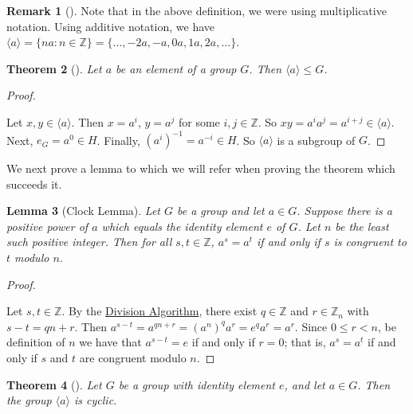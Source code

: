 \documentclass[10pt,openany,oneside]{book}
\theoremstyle{plain}
\newtheorem{theorem}{Theorem}[section]
\newtheorem{lemma}[theorem]{Lemma}
\theoremstyle{definition}
\theoremstyle{definition}
\newtheorem{remark}[theorem]{Remark}
\theoremstyle{definition}
\theoremstyle{definition}
\numberwithin{equation}{section}
\def\Z{\mathbb{Z}}
\newcommand{\lt}{<}
\begin{document}
\begin{remark}[]\label{remark-21}
Note that in the above definition, we were using multiplicative notation. Using additive notation, we have \(\langle a\rangle =\{na:n\in \Z\}=\{\ldots, -2a, -a, 0a, 1a, 2a, \ldots\}.\)%
\end{remark}
\begin{theorem}[{}]\label{theorem-23}
Let \(a\) be an element of a group \(G\). Then \(\langle a\rangle \leq G\).%
\end{theorem}
\begin{proof}\hypertarget{proof-19}{}
Let \(x,y\in \langle a\rangle\). Then \(x=a^i\), \(y=a^j\) for some \(i,j\in \Z\). So \(xy=a^ia^j=a^{i+j}\in \langle a\rangle\). Next, \(e_G=a^0\in H\). Finally, \((a^i)^{-1}=a^{-i}\in H\). So \(\langle a\rangle\) is a subgroup of \(G\).%
\end{proof}
We next prove a lemma to which we will refer when proving the theorem which succeeds it.%
\begin{lemma}[{Clock Lemma}]\label{clock}
Let \(G\) be a group and let \(a \in G\). Suppose there is a positive power of \(a\) which equals the identity element \(e\) of \(G\). Let \(n\) be the least such positive integer. Then for all \(s,t\in \Z\), \(a^s=a^t\) if and only if \(s\) is congruent to \(t\) modulo \(n\).%
\end{lemma}
\begin{proof}\hypertarget{proof-20}{}
Let \(s,t\in \Z\). By the \hyperref[divalg]{Division Algorithm}, there exist \(q\in \Z\) and \(r\in \Z_n\) with \(s-t=qn+r\). Then \(a^{s-t}=a^{qn+r}=(a^n)^qa^r=e^qa^r=a^r\). Since \(0\leq r\lt n\), be definition of \(n\) we have that \(a^{s-t}=e\) if and only if \(r=0\); that is, \(a^s=a^t\) if and only if \(s\) and \(t\) are congruent modulo \(n\).%
\end{proof}
\begin{theorem}[{}]\label{theorem-24}
Let \(G\) be a group with identity element \(e\), and let \(a\in G\). Then the group \(\langle a\rangle\) is cyclic.%
\end{theorem}
\end{document}
